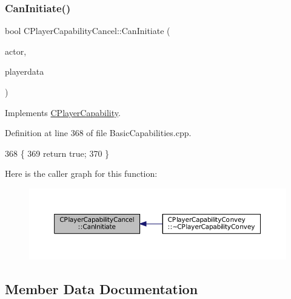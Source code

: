 \subsubsection{\texorpdfstring{Can\+Initiate()}{CanInitiate()}}
{\footnotesize\ttfamily bool C\+Player\+Capability\+Cancel\+::\+Can\+Initiate (\begin{DoxyParamCaption}\item[{std\+::shared\+\_\+ptr$<$ \hyperlink{classCPlayerAsset}{C\+Player\+Asset} $>$}]{actor,  }\item[{std\+::shared\+\_\+ptr$<$ \hyperlink{classCPlayerData}{C\+Player\+Data} $>$}]{playerdata }\end{DoxyParamCaption})\hspace{0.3cm}{\ttfamily [virtual]}}



Implements \hyperlink{classCPlayerCapability_aa83b1e1fcaff2985c378132d679154ea}{C\+Player\+Capability}.



Definition at line 368 of file Basic\+Capabilities.\+cpp.


\begin{DoxyCode}
368                                                                                                            
                \{
369     \textcolor{keywordflow}{return} \textcolor{keyword}{true};
370 \}
\end{DoxyCode}
Here is the caller graph for this function\+:
\nopagebreak
\begin{figure}[H]
\begin{center}
\leavevmode
\includegraphics[width=350pt]{classCPlayerCapabilityCancel_a8b4ad4a4983b01e458d439cf68fd2ba9_icgraph}
\end{center}
\end{figure}


\subsection{Member Data Documentation}
\hypertarget{classCPlayerCapabilityCancel_a239d2a965e7441fd81b79b8421707ff1}{}\label{classCPlayerCapabilityCancel_a239d2a965e7441fd81b79b8421707ff1} 
